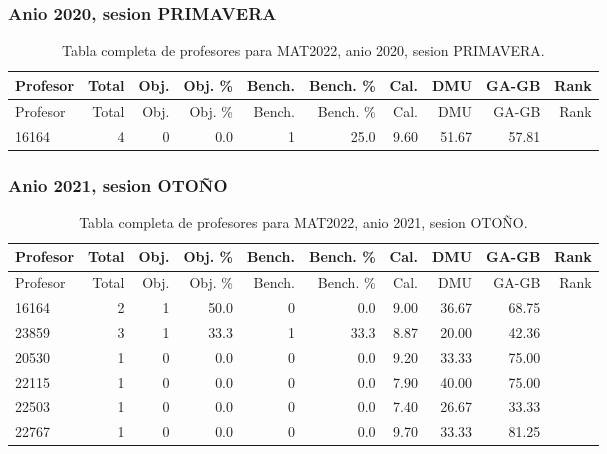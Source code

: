 \subsubsection{Anio 2020, sesion PRIMAVERA}

\begingroup
\scriptsize
\setlength{\tabcolsep}{3pt}
\begin{longtable}{lrrrrrrrrr}
\caption{Tabla completa de profesores para MAT2022, anio 2020, sesion PRIMAVERA.}\label{tab:prof-period-mat2022-2020-primavera}\\
\toprule
Profesor & Total & Obj. & Obj. \% & Bench. & Bench. \% & Cal. & DMU & GA-GB & Rank \\
\midrule
\endfirsthead
\toprule
Profesor & Total & Obj. & Obj. \% & Bench. & Bench. \% & Cal. & DMU & GA-GB & Rank \\
\midrule
\endhead
16164 & 4 & 0 & 0.0 & 1 & 25.0 & 9.60 & 51.67 & 57.81 &  \\
\bottomrule
\end{longtable}
\endgroup

\subsubsection{Anio 2021, sesion OTOÑO}

\begingroup
\scriptsize
\setlength{\tabcolsep}{3pt}
\begin{longtable}{lrrrrrrrrr}
\caption{Tabla completa de profesores para MAT2022, anio 2021, sesion OTOÑO.}\label{tab:prof-period-mat2022-2021-oto-o}\\
\toprule
Profesor & Total & Obj. & Obj. \% & Bench. & Bench. \% & Cal. & DMU & GA-GB & Rank \\
\midrule
\endfirsthead
\toprule
Profesor & Total & Obj. & Obj. \% & Bench. & Bench. \% & Cal. & DMU & GA-GB & Rank \\
\midrule
\endhead
16164 & 2 & 1 & 50.0 & 0 & 0.0 & 9.00 & 36.67 & 68.75 &  \\
23859 & 3 & 1 & 33.3 & 1 & 33.3 & 8.87 & 20.00 & 42.36 &  \\
20530 & 1 & 0 & 0.0 & 0 & 0.0 & 9.20 & 33.33 & 75.00 &  \\
22115 & 1 & 0 & 0.0 & 0 & 0.0 & 7.90 & 40.00 & 75.00 &  \\
22503 & 1 & 0 & 0.0 & 0 & 0.0 & 7.40 & 26.67 & 33.33 &  \\
22767 & 1 & 0 & 0.0 & 0 & 0.0 & 9.70 & 33.33 & 81.25 &  \\
\bottomrule
\end{longtable}
\endgroup

